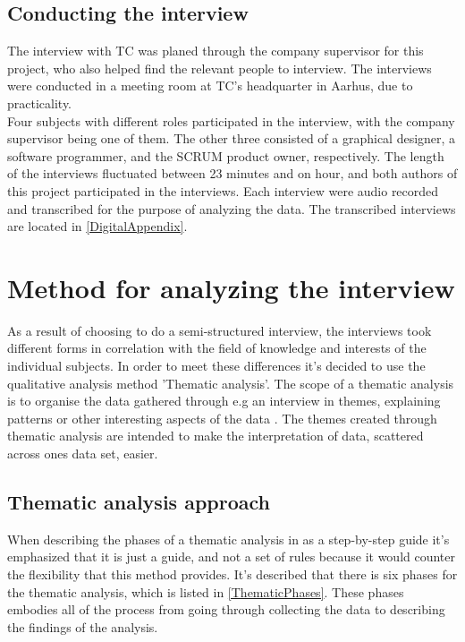 \subsection{Conducting the interview}
\label{ConductingInterview}
The interview with TC was planed through the company supervisor for this project, who also helped find the relevant people to interview. The interviews were conducted in a meeting room at TC's headquarter in Aarhus, due to practicality.\\
Four subjects with different roles participated in the interview, with the company supervisor being one of them. The other three consisted of a graphical designer, a software programmer, and the SCRUM product owner, respectively. The length of the interviews fluctuated between 23 minutes and on hour, and both authors of this project participated in the interviews. Each interview were audio recorded and transcribed for the purpose of analyzing the data. The transcribed interviews are located in \autoref{DigitalAppendix}.

\section{Method for analyzing the interview}
\label{InterviewAnalysis}
As a result of choosing to do a semi-structured interview, the interviews took different forms in correlation with the field of knowledge and interests of the individual subjects. In order to meet these differences it's decided to use the qualitative analysis method 'Thematic analysis'. The scope of a thematic analysis is to organise the data gathered through e.g an interview in themes, explaining patterns or other interesting aspects of the data \parencite{PDF:Braun2006}. The themes created through thematic analysis are intended to make the interpretation of data, scattered across ones data set, easier. 

\subsection{Thematic analysis approach}
\label{ThematicAnalysisApproach}
When describing the phases of a thematic analysis in \parencite[86]{PDF:Braun2006} as a step-by-step guide it's emphasized that it is just a guide, and not a set of rules because it would counter the flexibility that this method provides. It's described that there is six phases for the thematic analysis, which is listed in \autoref{ThematicPhases}. These phases embodies all of the process from going through collecting the data to describing the findings of the analysis.

